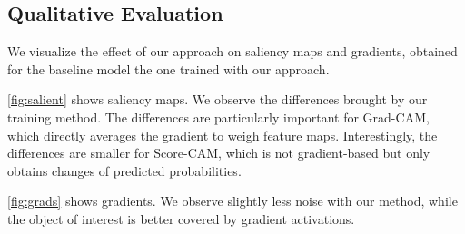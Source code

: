 \subsection{Qualitative Evaluation}
We visualize the effect of our approach on saliency maps and gradients, obtained for the baseline 
model \vs the one trained with our approach.



\noindent \autoref{fig:salient} shows saliency maps. We observe the differences brought by our 
training method. The differences are particularly important for Grad-CAM, which directly averages 
the gradient to weigh feature maps. Interestingly, the differences are smaller for Score-CAM, which 
is not gradient-based but only obtains changes of predicted probabilities.


\noindent \autoref{fig:grads} shows gradients. We observe slightly less noise with our method, while 
the object of interest is better covered by gradient activations.

